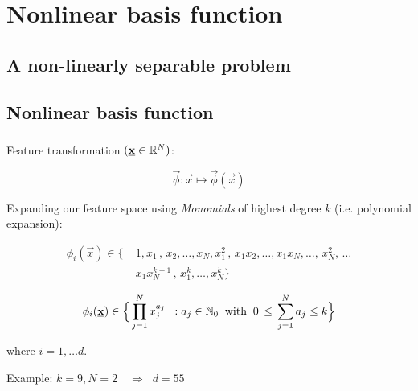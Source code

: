 \section{Nonlinear basis function}

\subsection{A non-linearly separable problem}

\begin{frame}\frametitle{\subsecname}


\end{frame}

\begin{frame}\frametitle{\subsecname}


\end{frame}

\subsection{Nonlinear basis function}


\begin{frame}\frametitle{\subsecname}

Feature transformation $(\underline{\mathbf{x}}\in \mathbb{R}^N)$:

\begin{equation}
\vec \phi: \vec x \mapsto \vec \phi(\vec x)
\end{equation}

Expanding our feature space using \emph{Monomials} of highest degree $k$ (i.e. polynomial expansion):

\begin{align*}
\phi_i(\vec x) \in 
\{\;
&1, 
x_1\,,\, x_2, \ldots, x_N,
x_1^2\,,\, x_1 x_2, \ldots, x_1x_N,\ldots,\,x_N^2,\,\ldots\\
&x_1 x_N^{k-1}\,,\, x_1^k, \ldots, x_N^k
\}
\end{align*}

\begin{equation}
\phi_i(\underline{\mathbf{x}}) \in \Big\{ \prod_{j=1}^N x_j^{a_j} \;\;: a_j \in \mathbb{N}_0 \;\; \text{with} \;\; 0 \, \le \, \sum_{j=1}^{N} a_j \le k  
\Big\} 
\end{equation}

where $i=1,\ldots d$.

Example: $k=9, N=2 \quad \Rightarrow \;\; d=55$


\end{frame}

